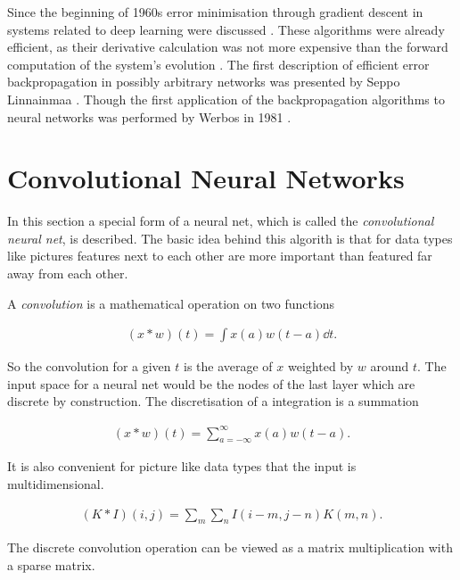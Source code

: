 \documentclass[12pt, a4paper]{thesis}
\begin{document}
Since the beginning of 1960s error minimisation through gradient
descent in systems related to deep learning were discussed
\cite{Kelley1960,bryson1961,BRYSON-DENHAM-61A,PONTRYAGIN61A,dreyfus1962,Wilkinson1965,Amari1967TAP,bryson1969applied}.
These algorithms were already efficient, as their derivative
calculation was not more expensive than the forward computation of the
system's evolution \cite{schmidhuber15_deep_learn_neural_networ}.  The
first description of efficient error backpropagation in possibly
arbitrary networks was presented by Seppo Linnainmaa
\cite{Linnainmaa:1970,Linnainmaa:1976}. Though the first application
of the backpropagation algorithms to neural networks was performed by
Werbos in 1981 \cite{Werbos:81sensitivity}.

\section{Convolutional Neural Networks}
\label{sec:orgf8e2395}

In this section a special form of a neural net, which is called the
\emph{convolutional neural net}, is described. The basic idea behind
this algorith is that for data types like pictures features next to
each other are more important than featured far away from each other.

A \emph{convolution} is a mathematical operation on two functions

\begin{align}
 (x * w)(t) = \int x(a) w(t-a)\dd t.
\end{align}

So the convolution for a given \(t\) is the average of \(x\) weighted
by \(w\) around \(t\). The input space for a neural net would be the
nodes of the last layer which are discrete by construction. The
discretisation of a integration is a summation

\begin{align}
 (x * w)(t) = \sum^{\infty}_{a=-\infty} x(a) w(t-a).
\end{align}

It is also convenient for picture like data types that the input is
multidimensional.

\begin{align}
 (K * I)(i,j) = \sum_{m} \sum_{n} I(i-m,j-n) K(m,n).
\end{align}

The discrete convolution operation can be viewed as a matrix multiplication with a
sparse matrix.
\end{document}
